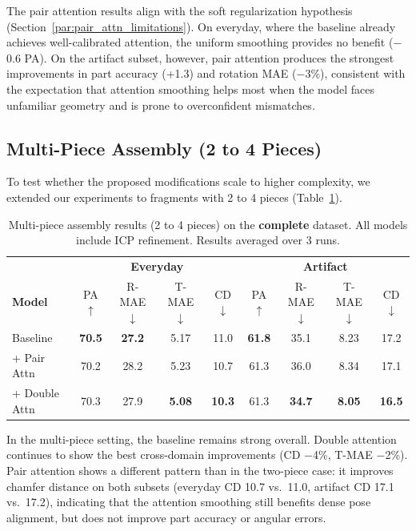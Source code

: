 The pair attention results align with the soft regularization hypothesis (Section~\ref{par:pair_attn_limitations}). On everyday, where the baseline already achieves well-calibrated attention, the uniform smoothing provides no benefit ($-$0.6 PA). On the artifact subset, however, pair attention produces the strongest improvements in part accuracy (+1.3) and rotation MAE ($-$3\%), consistent with the expectation that attention smoothing helps most when the model faces unfamiliar geometry and is prone to overconfident mismatches.

\subsection{Multi-Piece Assembly (2 to 4 Pieces)}

To test whether the proposed modifications scale to higher complexity, we extended our experiments to fragments with 2 to 4 pieces (Table~\ref{tab:multi_piece}).

\begin{table}[H]
\centering
\caption{Multi-piece assembly results (2 to 4 pieces) on the \textbf{complete} dataset. All models include ICP refinement. Results averaged over 3 runs.}
\label{tab:multi_piece}
\begin{tabular}{l|cccc|cccc}
\toprule
& \multicolumn{4}{c|}{\textbf{Everyday}} & \multicolumn{4}{c}{\textbf{Artifact}} \\
\textbf{Model} & PA$\uparrow$ & R-MAE$\downarrow$ & T-MAE$\downarrow$ & CD$\downarrow$
               & PA$\uparrow$ & R-MAE$\downarrow$ & T-MAE$\downarrow$ & CD$\downarrow$ \\
\midrule
Baseline & \textbf{70.5} & \textbf{27.2} & 5.17 & 11.0 & \textbf{61.8} & 35.1 & 8.23 & 17.2 \\
+ Pair Attn & 70.2 & 28.2 & 5.23 & 10.7 & 61.3 & 36.0 & 8.34 & 17.1 \\
+ Double Attn & 70.3 & 27.9 & \textbf{5.08} & \textbf{10.3} & 61.3 & \textbf{34.7} & \textbf{8.05} & \textbf{16.5} \\
\bottomrule
\end{tabular}
\end{table}

In the multi-piece setting, the baseline remains strong overall. Double attention continues to show the best cross-domain improvements (CD $-$4\%, T-MAE $-$2\%). Pair attention shows a different pattern than in the two-piece case: it improves chamfer distance on both subsets (everyday CD 10.7 vs.\ 11.0, artifact CD 17.1 vs.\ 17.2), indicating that the attention smoothing still benefits dense pose alignment, but does not improve part accuracy or angular errors.

